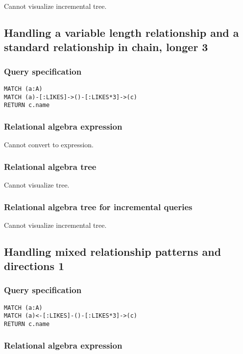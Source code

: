 Cannot visualize incremental tree.

\subsection{Handling a variable length relationship and a standard relationship in chain, longer 3}

\subsubsection*{Query specification}

\begin{lstlisting}
MATCH (a:A)
MATCH (a)-[:LIKES]->()-[:LIKES*3]->(c)
RETURN c.name
\end{lstlisting}

\subsubsection*{Relational algebra expression}

Cannot convert to expression.

\subsubsection*{Relational algebra tree}

Cannot visualize tree.

\subsubsection*{Relational algebra tree for incremental queries}

Cannot visualize incremental tree.

\subsection{Handling mixed relationship patterns and directions 1}

\subsubsection*{Query specification}

\begin{lstlisting}
MATCH (a:A)
MATCH (a)<-[:LIKES]-()-[:LIKES*3]->(c)
RETURN c.name
\end{lstlisting}

\subsubsection*{Relational algebra expression}

